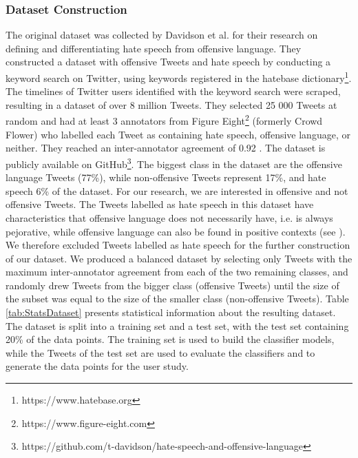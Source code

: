 \subsubsection{Dataset Construction}
The original dataset was collected by Davidson et al. \cite{davidson2017automated} for their research on defining and differentiating hate speech from offensive language. They constructed a dataset with offensive Tweets and hate speech by conducting a keyword search on Twitter, using keywords registered in the hatebase dictionary\footnote{https://www.hatebase.org}. The timelines of Twitter users identified with the keyword search were scraped, resulting in a dataset of over 8 million Tweets. They selected 25 000 Tweets at random and had at least 3 annotators from Figure Eight\footnote{https://www.figure-eight.com} (formerly Crowd Flower) who labelled each Tweet as containing hate speech, offensive language, or neither. They reached an inter-annotator agreement of 0.92 \cite{davidson2017automated}. The dataset is publicly available on GitHub\footnote{https://github.com/t-davidson/hate-speech-and-offensive-language}.\newline
The biggest class in the dataset are the offensive language Tweets (77\%), while non-offensive Tweets represent 17\%, and hate speech 6\% of the dataset. \newline
For our research, we are interested in offensive and not offensive Tweets. The Tweets labelled as hate speech in this dataset have characteristics that offensive language does not necessarily have, i.e. is always pejorative, while offensive language can also be found in positive contexts (see \cite{davidson2017automated}). We therefore excluded Tweets labelled as hate speech for the further construction of our dataset. We produced a balanced dataset by selecting only Tweets with the maximum inter-annotator agreement from each of the two remaining classes, and randomly drew Tweets from the bigger class (offensive Tweets) until the size of the subset was equal to the size of the smaller class (non-offensive Tweets). Table \ref{tab:StatsDataset} presents statistical information about the resulting dataset.\newline
The dataset is split into a training set and a test set, with the test set containing 20\% of the data points. The training set is used to build the classifier models, while the Tweets of the test set are used to evaluate the classifiers and to generate the data points for the user study.
